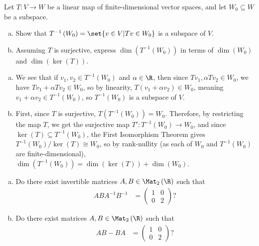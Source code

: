 \documentclass[10pt]{mypackage}
\begin{document}
\begin{problem}[Problem 3]
  Let $T\colon V\rightarrow W$ be a linear map of finite-dimensional vector spaces, and let $W_0\subseteq W$ be a subspace.
  \begin{enumerate}[(a)]
    \item Show that $T^{-1}\left( W_0 \right) = \set{v\in V | Tv\in W_0}$ is a subspace of $V$.
    \item Assuming $T$ is surjective, express $\dim \left( T^{-1}\left( W_0 \right) \right)$ in terms of $\dim\left( W_0 \right)$ and $\dim\left( \ker\left( T \right) \right)$.
  \end{enumerate}
\end{problem}
\begin{solution}\hfill
  \begin{enumerate}[(a)]
    \item We see that if $v_1,v_2\in T^{-1}\left( W_0 \right)$ and $\alpha\in\R$, then since $Tv_1,\alpha Tv_2\in W_0$, we have $Tv_1 + \alpha Tv_2 \in W_0$, so by linearity, $T\left( v_1 + \alpha v_2 \right)\in W_0$, meaning $v_1 + \alpha v_2\in T^{-1}\left( W_0 \right)$, so $T^{-1}\left( W_0 \right)$ is a subspace of $V$.
    \item First, since $T$ is surjective, $T\left( T^{-1}\left( W_0 \right) \right) = W_0$. Therefore, by restricting the map $T$, we get the surjective map $T'\colon T^{-1}\left( W_0 \right)\rightarrow W_0$, and since $\ker\left( T \right)\subseteq T^{-1}\left( W_0 \right)$, the First Isomorphism Theorem gives $T^{-1}\left( W_0 \right)/\ker\left( T \right)\cong W_0$, so by rank-nullity (as each of $W_0$ and $T^{-1}\left( W_0 \right)$ are finite-dimensional), $\dim\left( T^{-1}\left( W_0 \right) \right) = \dim\left( \ker\left( T \right) \right) + \dim\left( W_0 \right)$.
  \end{enumerate}
\end{solution}
\begin{problem}[Problem 4]\hfill
  \begin{enumerate}[(a)]
    \item Do there exist invertible matrices $A,B\in \Mat_{2}\left( \R \right)$ such that
      \begin{align*}
        ABA^{-1}B^{-1} &= \begin{pmatrix}1 & 0 \\ 0 & 2\end{pmatrix}?
      \end{align*}
    \item Do there exist matrices $A,B\in \Mat_{2}\left( \R \right)$ such that
      \begin{align*}
        AB - BA &= \begin{pmatrix}1 & 0 \\ 0 & 2\end{pmatrix}?
      \end{align*}
  \end{enumerate}
\end{problem}
\end{document}
